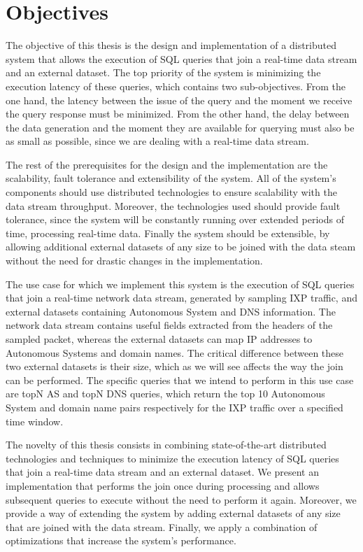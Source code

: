 \section{Objectives}

The objective of this thesis is the design and implementation of a distributed system that allows the execution of SQL queries that join a real-time data stream and an external dataset. The top priority of the system is minimizing the execution latency of these queries, which contains two sub-objectives. From the one hand, the latency between the issue of the query and the moment we receive the query response must be minimized. From the other hand, the delay between the data generation and the moment they are available for querying must also be as small as possible, since we are dealing with a real-time data stream. 

The rest of the prerequisites for the design and the implementation are the scalability, fault tolerance and extensibility of the system. All of the system's components should use distributed technologies to ensure scalability with the data stream throughput. Moreover, the technologies used should provide fault tolerance, since the system will be constantly running over extended periods of time, processing real-time data. Finally the system should be extensible, by allowing additional external datasets of any size to be joined with the data steam without the need for drastic changes in the implementation.

The use case for which we implement this system is the execution of SQL queries that join a real-time network data stream, generated by sampling IXP traffic, and external datasets containing Autonomous System and DNS information. The network data stream contains useful fields extracted from the headers of the sampled packet, whereas the external datasets can map IP addresses to Autonomous Systems and domain names. The critical difference between these two external datasets is their size, which as we will see affects the way the join can be performed. The specific queries that we intend to perform in this use case are topN AS and topN DNS queries, which return the top 10 Autonomous System and domain name pairs respectively for the IXP traffic over a specified time window.

The novelty of this thesis consists in combining state-of-the-art distributed technologies and techniques to minimize the execution latency of SQL queries that join a real-time data stream and an external dataset. We present an implementation that performs the join once during processing and allows subsequent queries to execute without the need to perform it again. Moreover, we provide a way of extending the system by adding external datasets of any size that are joined with the data stream. Finally, we apply a combination of optimizations that increase the system's performance.


